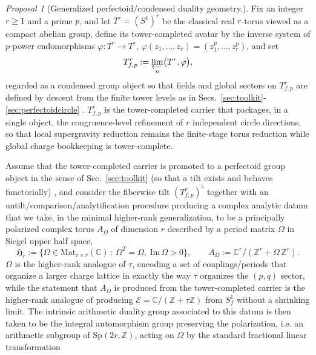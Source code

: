 \documentclass[11pt]{article}
\theoremstyle{remark}
\newtheorem{proposal}[theorem]{Proposal }
\newcommand{\C}{\mathbb{C}}
\newcommand{\Z}{\mathbb{Z}}
\newcommand{\calE}{\mathcal{E}}
\begin{document}
\begin{proposal}[Generalized perfectoid/condensed duality geometry.] Fix an integer \(r\ge 1\) and a prime \(p\), and let \(T^{r}=(S^{1})^{r}\) be the classical real \(r\)-torus viewed as a compact abelian group, define its tower-completed avatar by the inverse system of \(p\)-power endomorphisms \(\varphi:T^{r}\to T^{r}\), \(\varphi(z_{1},\ldots,z_{r})=(z_{1}^{p},\ldots,z_{r}^{p})\), and set
\begin{equation}\label{eq:perf-torusa}
T^{r}_{f,p}:=\varprojlim_{n}\bigl(T^{r},\varphi\bigr),
\end{equation}
regarded as a condensed group object so that fields and global sectors on \(T^{r}_{f,p}\) are defined by descent from the finite tower levels as in Secs.~\ref{sec:toolkit}-\ref{sec:perfectoidcircle} \cite{ClausenScholze}. \(T^{r}_{f,p}\) is the tower-completed carrier that packages, in a single object, the congruence-level refinement of \(r\) independent circle directions, so that local supergravity reduction remains the finite-stage torus reduction while global charge bookkeeping is tower-complete. 
\end{proposal}
Assume that the tower-completed carrier is promoted to a perfectoid group object in the sense of Sec.~\ref{sec:toolkit} (so that a tilt exists and behaves functorially) \cite{Scholze2012}, and consider the fiberwise tilt \((T^{r}_{f,p})^{\flat}\) together with an untilt/comparison/analytification procedure producing a complex analytic datum that we take, in the minimal higher-rank generalization, to be a principally polarized complex torus \(A_{\Omega}\) of dimension \(r\) described by a period matrix \(\Omega\) in Siegel upper half space,
\begin{equation}\label{eq:siegel}
\mathfrak{H}_{r}:=\{\Omega\in \mathrm{Mat}_{r\times r}(\C)\,:\ \Omega^{T}=\Omega,\ \mathrm{Im}\,\Omega>0\},
\qquad
A_{\Omega}:=\C^{r}/(\Z^{r}+\Omega\,\Z^{r}).
\end{equation}
\(\Omega\) is the higher-rank analogue of \(\tau\), encoding a set of couplings/periods that organize a larger charge lattice in exactly the way \(\tau\) organizes the \((p,q)\) sector, while the statement that \(A_{\Omega}\) is produced from the tower-completed carrier is the higher-rank analogue of producing \(\calE=\C/(\Z+\tau\Z)\) from \(S^{1}_{f}\) without a shrinking limit. The intrinsic arithmetic duality group associated to this datum is then taken to be the integral automorphism group preserving the polarization, i.e. an arithmetic subgroup of \(\mathrm{Sp}(2r,\Z)\), acting on \(\Omega\) by the standard fractional linear transformation
\end{document}
